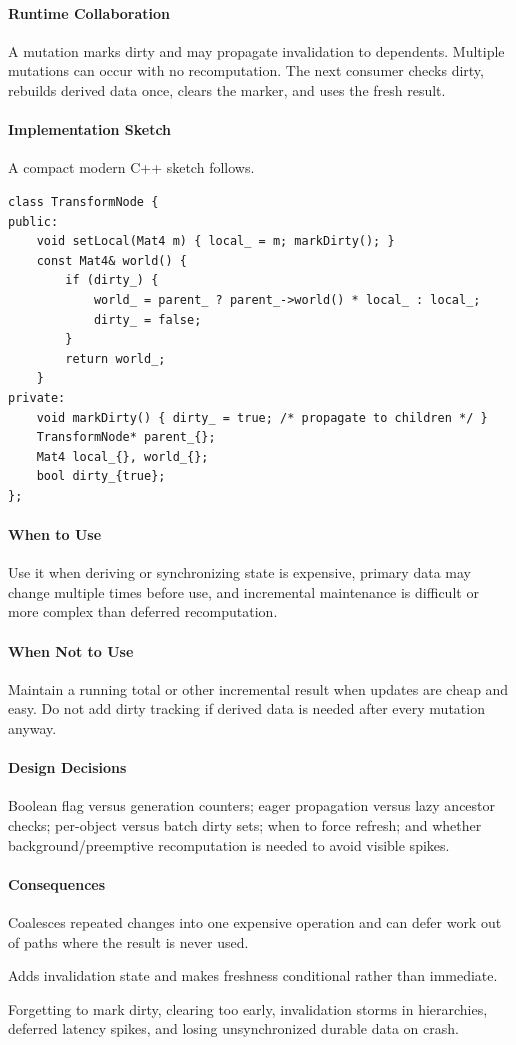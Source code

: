 \documentclass[11pt]{article}
\begin{document}
\paragraph{Runtime Collaboration} A mutation marks dirty and may propagate invalidation to dependents. Multiple mutations can occur with no recomputation. The next consumer checks dirty, rebuilds derived data once, clears the marker, and uses the fresh result.
\paragraph{Implementation Sketch} A compact modern C++ sketch follows.
\begin{lstlisting}
class TransformNode {
public:
    void setLocal(Mat4 m) { local_ = m; markDirty(); }
    const Mat4& world() {
        if (dirty_) {
            world_ = parent_ ? parent_->world() * local_ : local_;
            dirty_ = false;
        }
        return world_;
    }
private:
    void markDirty() { dirty_ = true; /* propagate to children */ }
    TransformNode* parent_{};
    Mat4 local_{}, world_{};
    bool dirty_{true};
};
\end{lstlisting}
\paragraph{When to Use} Use it when deriving or synchronizing state is expensive, primary data may change multiple times before use, and incremental maintenance is difficult or more complex than deferred recomputation.
\paragraph{When Not to Use} Maintain a running total or other incremental result when updates are cheap and easy. Do not add dirty tracking if derived data is needed after every mutation anyway.
\paragraph{Design Decisions} Boolean flag versus generation counters; eager propagation versus lazy ancestor checks; per-object versus batch dirty sets; when to force refresh; and whether background/preemptive recomputation is needed to avoid visible spikes.
\paragraph{Consequences}
\begin{description}[leftmargin=2.7cm,style=nextline]
\item[Benefits] Coalesces repeated changes into one expensive operation and can defer work out of paths where the result is never used.
\item[Costs] Adds invalidation state and makes freshness conditional rather than immediate.
\item[Risks] Forgetting to mark dirty, clearing too early, invalidation storms in hierarchies, deferred latency spikes, and losing unsynchronized durable data on crash.
\end{description}
\end{document}
